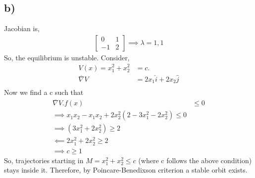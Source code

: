 \documentclass{article}
\begin{document}
\subsection*{b)}
Jacobian is,
\begin{align*}
    \begin{bmatrix} 0 & 1 \\ -1 & 2 \end{bmatrix}
    \implies \lambda = 1, 1
\end{align*}
So, the equilibrium is unstable. Consider,
\begin{align}
    V(x) = x_1^2 + x_2^2 &= c. \\
    \overline{\nabla}V &= 2x_1\hat{i} + 2x_2\hat{j} \\
\end{align}
Now we find a c such that
\begin{align*}
    \overline{\nabla}V.f(x) &\leq 0 \\
    \implies x_1x_2 - x_1x_2 + 2x_2^2(2 - 3x_1^2 - 2x_2^2) \leq 0 \\
    \implies (3x_1^2 + 2x_2^2) \geq 2\\
    \impliedby 2x_1^2 + 2x_2^2 \geq 2 \\
    \implies c \geq 1
\end{align*}
So, trajectories starting in $M = {x_1^2 + x_2^2 \leq c}$ (where c follows the above condition) stays inside it. Therefore, by Poincare-Benedixson criterion a stable orbit exists.
\end{document}

